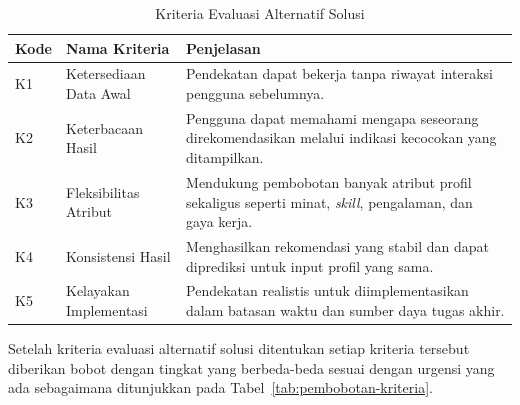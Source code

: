 \begin{table}[H]
  \caption{Kriteria Evaluasi Alternatif Solusi}
  \label{tab:kriteria-evaluasi}
  \begin{tabularx}{\textwidth}{p{1.5cm} p{4cm} X}
    \toprule
    \textbf{Kode} & \textbf{Nama Kriteria} & \textbf{Penjelasan} \\
    \midrule
    K1 & Ketersediaan Data Awal & Pendekatan dapat bekerja tanpa riwayat interaksi pengguna sebelumnya. \\
    \midrule
    K2 & Keterbacaan Hasil & Pengguna dapat memahami mengapa seseorang direkomendasikan melalui indikasi kecocokan yang ditampilkan. \\
    \midrule
    K3 & Fleksibilitas Atribut & Mendukung pembobotan banyak atribut profil sekaligus seperti minat, \emph{skill}, pengalaman, dan gaya kerja. \\
    \midrule
    K4 & Konsistensi Hasil & Menghasilkan rekomendasi yang stabil dan dapat diprediksi untuk input profil yang sama. \\
    \midrule
    K5 & Kelayakan Implementasi & Pendekatan realistis untuk diimplementasikan dalam batasan waktu dan sumber daya tugas akhir. \\
    \bottomrule
  \end{tabularx}
\end{table}

Setelah kriteria evaluasi alternatif solusi ditentukan setiap kriteria tersebut diberikan bobot dengan tingkat yang berbeda-beda sesuai dengan urgensi yang ada sebagaimana ditunjukkan pada Tabel~\ref{tab:pembobotan-kriteria}.

